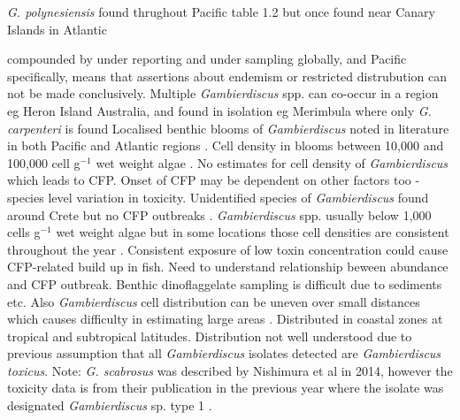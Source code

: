 \documentclass[12pt]{article}
\begin{document}
\emph{G. polynesiensis} found thrughout Pacific table 1.2 but once found near Canary Islands in Atlantic \cite{fraga2011gambierdiscus}


compounded by under reporting and under sampling globally, and Pacific specifically, means that assertions about endemism or restricted distrubution can not be made conclusively.
Multiple \emph{Gambierdiscus} spp. can co-occur in a region eg Heron Island Australia, and found in isolation eg Merimbula where only \emph{G. carpenteri} is found %
Localised benthic blooms of \emph{Gambierdiscus} noted in literature in both Pacific and Atlantic regions \cite{nakajima1981toxicity,withers1984ciguatera,chinain1999seasonal,darius2007ciguatera}.
Cell density in blooms between 10,000 and 100,000 cell g$^{-1}$ wet weight algae \cite{litaker2010global}. No estimates for cell density of \emph{Gambierdiscus} which leads to CFP. Onset of CFP may be dependent on other factors too - species level variation in toxicity. Unidentified species of \emph{Gambierdiscus} found around Crete but no CFP outbreaks \cite{caillaud2010update}.
\emph{Gambierdiscus} spp. usually below 1,000 cells g$^{-1}$ wet weight algae \cite{litaker2010global} but in some locations those cell densities are consistent throughout the year \cite{chinain1999seasonal}.
Consistent exposure of low toxin concentration could cause CFP-related build up in fish. Need to understand relationship beween abundance and CFP outbreak. Benthic dinoflaggelate sampling is difficult due to sediments etc. Also \emph{Gambierdiscus} cell distribution can be uneven over small distances which causes difficulty in estimating large areas \cite{lobel1988assessment,ballantine1988population,litaker2010global}.
Distributed in coastal zones at tropical and subtropical latitudes.
Distribution not well understood due to previous assumption that all \emph{Gambierdiscus} isolates detected are \emph{Gambierdiscus toxicus}.
Note: \emph{G. scabrosus} was described by Nishimura et al in 2014, however the toxicity data is from their publication in the previous year where the isolate was designated \emph{Gambierdiscus} sp. type 1 \cite{nishimura2013genetic,nishimura2014morphology}.
\end{document}
